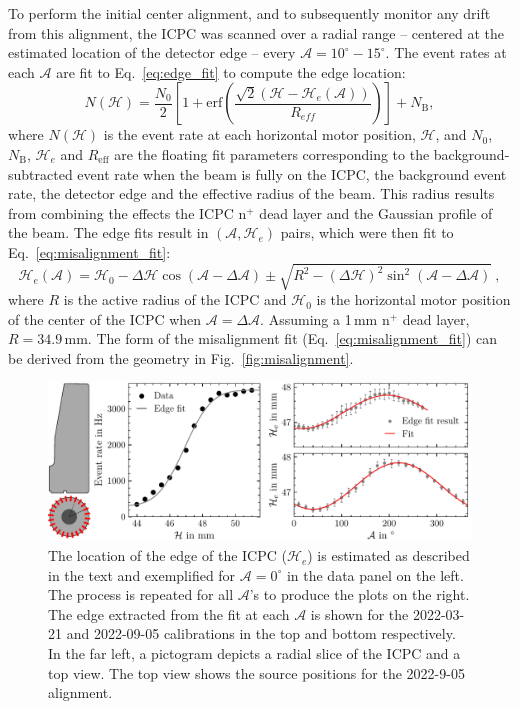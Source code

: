 To perform the initial center alignment, and to subsequently monitor any drift from this alignment, the ICPC was scanned over a radial range -- centered at the estimated location of the detector edge -- every $\mathcal{A} = 10^{\circ} - 15^{\circ}$. The event rates at each $\mathcal{A}$ are fit to Eq.~\ref{eq:edge_fit} to compute the edge location:
\begin{equation}
    N(\mathcal{H}) = \dfrac{N_0}{2} \left[ 1 + \text{erf}\left(\dfrac{\sqrt{2} (\mathcal{H} - \mathcal{H}_e(\mathcal{A}))}{R_{eff}}\right) \right] + N_\text{B},
	\label{eq:edge_fit}
\end{equation}
where $N(\mathcal{H})$ is the event rate at each horizontal motor position, $\mathcal{H}$, and $N_0$, $N_\text{B}$, $\mathcal{H}_e$ and $R_\text{eff}$ are the floating fit parameters corresponding to the background-subtracted event rate when the \CsS{} beam is fully on the ICPC, the background event rate, the detector edge and the effective radius of the beam. This radius results from combining the effects the ICPC n$^+$ dead layer and the Gaussian profile of the \CsS{} beam. The edge fits result in $(\mathcal{A}, \mathcal{H}_e)$ pairs, which were then fit to Eq.~\ref{eq:misalignment_fit}: 
\begin{equation}
	\mathcal{H}_e(\mathcal{A}) = \mathcal{H}_0 - \Delta \mathcal{H} \cos(\mathcal{A} - \Delta\mathcal{A}) \pm \sqrt{R^2 - (\Delta \mathcal{H})^2 \sin^2(\mathcal{A} - \Delta\mathcal{A})}~,
	\label{eq:misalignment_fit}
\end{equation}
where $R$ is the active radius of the ICPC and $\mathcal{H}_0$ is the horizontal motor position of the center of the ICPC when $\mathcal{A} = \Delta \mathcal{A}$. Assuming a 1\,mm n$^+$ dead layer, $R = 34.9$\,mm. The form of the misalignment fit (Eq.~\ref{eq:misalignment_fit}) can be derived from the geometry in Fig.~\ref{fig:misalignment}. 
\begin{figure}[htb]
    \centering
    \includegraphics[width=6in]{figs/integration/center_alignment.pdf}
    \caption{The location of the edge of the ICPC ($\mathcal{H}_e$) is estimated as described in the text and exemplified for $\mathcal{A} = 0^{\circ}$ in the data panel on the left. The process is repeated for all $\mathcal{A}$'s to produce the plots on the right. The edge extracted from the fit at each $\mathcal{A}$ is shown for the 2022-03-21 and 2022-09-05 calibrations in the top and bottom respectively. In the far left, a pictogram depicts a radial slice of the ICPC and a top view. The top view shows the \CsS{} source positions for the 2022-9-05 alignment.}
    \label{fig:center_alignment}
\end{figure}

